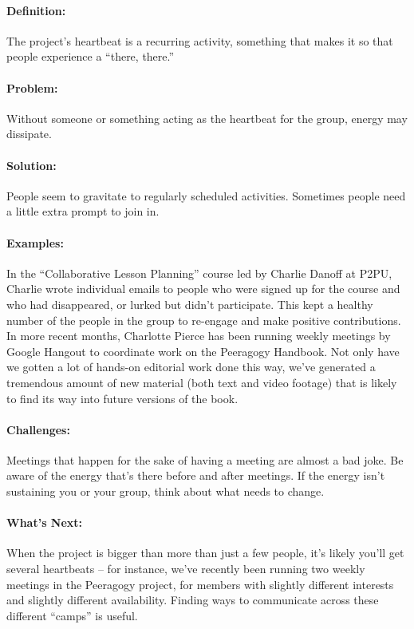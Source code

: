 \paragraph{Definition:} The project's heartbeat is a recurring activity,
something that makes it so that people experience a ``there, there.''

\paragraph{Problem:} Without someone or something acting as the heartbeat
for the group, energy may dissipate.

\paragraph{Solution:} People seem to gravitate to regularly scheduled
activities. Sometimes people need a little extra prompt to join in.

\paragraph{Examples:} In the ``Collaborative Lesson Planning'' course led
by Charlie Danoff at P2PU, Charlie wrote individual emails to people who
were signed up for the course and who had disappeared, or lurked but
didn't participate. This kept a healthy number of the people in the
group to re-engage and make positive contributions. In more recent
months, Charlotte Pierce has been running weekly meetings by Google
Hangout to coordinate work on the Peeragogy Handbook. Not only have we
gotten a lot of hands-on editorial work done this way, we've generated a
tremendous amount of new material (both text and video footage) that is
likely to find its way into future versions of the book.

\paragraph{Challenges:} Meetings that happen for the sake of having a
meeting are almost a bad joke. Be aware of the energy that's there
before and after meetings. If the energy isn't sustaining you or your
group, think about what needs to change.

\paragraph{What's Next:} When the project is bigger than more than just a
few people, it's likely you'll get several heartbeats -- for instance,
we've recently been running two weekly meetings in the Peeragogy
project, for members with slightly different interests and slightly
different availability. Finding ways to communicate across these
different ``camps'' is useful.


